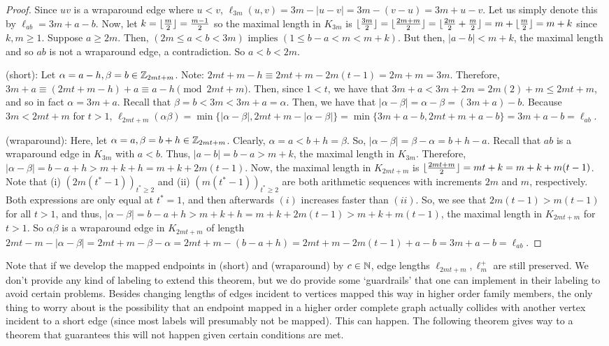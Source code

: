 \begin{proof}
Since $uv$ is a wraparound edge where $u<v$, $\ell_{3m}(u,v)=3m-|u-v|=3m-(v-u)=3m+u-v$. Let us simply denote this by $\ell_{ab}=3m+a-b$. Now, let $k=\lfloor\frac{m}{2}\rfloor=\frac{m-1}{2}$ so the maximal length in $K_{3m}$ is $\lfloor\frac{3m}{2}\rfloor=\lfloor\frac{2m+m}{2}\rfloor=\lfloor\frac{2m}{2}+\frac{m}{2}\rfloor=m+\lfloor\frac{m}{2}\rfloor=m+k$ since $k,m\geq 1$. Suppose $a\geq 2m$. Then, $(2m\leq a<b<3m)\text{ implies } (1\leq b-a<m<m+k).$ But then, $|a-b|<m+k$, the maximal length and so $ab$ is not a wraparound edge, a contradiction. So $a<b<2m$.\newline

\noindent (short): Let $\alpha= a-h,\beta=b\in \mathbb{Z}_{2mt+m}$. Note: $2mt+m-h\equiv 2mt+m-2m(t-1)=2m+m=3m$. Therefore, $3m+a\equiv (2mt+m-h)+a\equiv a-h \pmod{2mt+m}$. Then, since $1<t$, we have that $3m+a<3m+2m=2m(2)+m\leq 2mt+m$, and so in fact $\alpha = 3m+a$. Recall that $\beta=b<3m<3m+a=\alpha$. Then, we have that $|\alpha-\beta|=\alpha-\beta=(3m+a)-b$. Because $3m<2mt+m$ for $t>1$, $\ell_{2mt+m}(\alpha\beta)=\min\{|\alpha-\beta|,2mt+m-|\alpha-\beta|\}=\min\{3m+a-b, 2mt+m+a-b\}=3m+a-b=\ell_{ab}$.\newline

\noindent (wraparound): Here, let $\alpha =a,\beta=b+h\in \mathbb{Z}_{2mt+m}$. Clearly, $\alpha=a<b+h=\beta$. So, $|\alpha-\beta|=\beta-\alpha=b+h-a$. Recall that $ab$ is a wraparound edge in $K_{3m}$ with $a<b$. Thus, $|a-b|=b-a>m+k$, the maximal length in $K_{3m}$. Therefore, $|\alpha-\beta|=b-a+h>m+k+h=m+k+2m(t-1)$. Now, the maximal length in $K_{2mt+m}$ is $\lfloor\frac{2mt+m}{2}\rfloor=mt+k=m+k+m(t-1)$. Note that (i) $(2m(t^{*}-1))_{t^{*}\geq 2}$ and (ii) $(m(t^{*}-1))_{t^{*}\geq 2}$ are both arithmetic sequences with increments $2m$ and $m$, respectively. Both expressions are only equal at $t^{*}=1$, and then afterwards $(i)$ increases faster than $(ii)$. So, we see that $2m(t-1)>m(t-1)$ for all $t>1$, and thus, $|\alpha-\beta|=b-a+h>m+k+h=m+k+2m(t-1)>m+k+m(t-1)$, the maximal length in $K_{2mt+m}$ for $t>1$. So $\alpha\beta$ is a wraparound edge in $K_{2mt+m}$ of length $2mt-m-|\alpha-\beta|=2mt+m-\beta-\alpha=2mt+m - (b-a+h)= 2mt+m-2m(t-1)+a-b=3m+a-b=\ell_{ab}$.

\end{proof}
Note that if we develop the mapped endpoints in (short) and (wraparound) by $c\in \mathbb{N}$, edge lengths $\ell_{2mt+m},\ell_{m}^{+}$ are still preserved. We don't provide any kind of labeling to extend this theorem, but we do provide some `guardrails' that one can implement in their labeling to avoid certain problems. Besides changing lengths of edges incident to vertices mapped this way in higher order family members, the only thing to worry about is the possibility that an endpoint mapped in a higher order complete graph actually collides with another vertex incident to a short edge (since most labels will presumably not be mapped). This can happen. The following theorem gives way to a theorem that guarantees this will not happen given certain conditions are met.\newline

